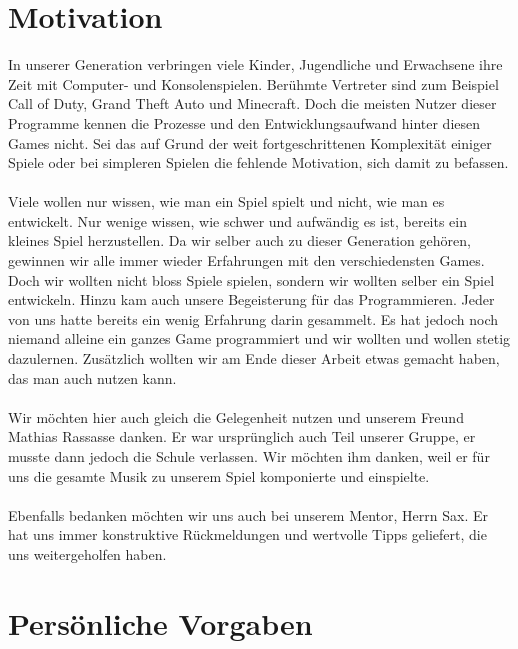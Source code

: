 \documentclass[11pt,a4paper]{scrbook}
\begin{document}
\section{Motivation}
In unserer Generation verbringen viele Kinder, Jugendliche und Erwachsene ihre Zeit mit Computer- und Konsolenspielen.
Berühmte Vertreter sind zum Beispiel Call of Duty, Grand Theft Auto und Minecraft.
Doch die meisten Nutzer dieser Programme kennen die Prozesse und den Entwicklungsaufwand hinter diesen Games nicht.
Sei das auf Grund der weit fortgeschrittenen Komplexität einiger Spiele
oder bei simpleren Spielen die fehlende Motivation, sich damit zu befassen.\\
\\
Viele wollen nur wissen, wie man ein Spiel spielt und nicht, wie man es entwickelt. Nur wenige wissen, wie schwer und aufwändig es ist, bereits ein kleines Spiel herzustellen.
Da wir selber auch zu dieser Generation gehören,
gewinnen wir alle immer wieder Erfahrungen mit den verschiedensten Games.
Doch wir wollten nicht bloss Spiele spielen,
sondern wir wollten selber ein Spiel entwickeln.
Hinzu kam auch unsere Begeisterung für das Programmieren.
Jeder von uns hatte bereits ein wenig Erfahrung darin gesammelt.
Es hat jedoch noch niemand alleine
ein ganzes Game programmiert und
wir wollten und wollen stetig dazulernen.
Zusätzlich wollten wir am Ende dieser Arbeit etwas gemacht haben, das man auch nutzen kann.\\
\\
Wir möchten hier auch gleich die Gelegenheit nutzen und unserem Freund Mathias Rassasse danken. Er war ursprünglich auch Teil unserer Gruppe, er musste dann jedoch die Schule verlassen. Wir möchten ihm danken, weil er für uns die gesamte Musik zu unserem Spiel komponierte und einspielte.\\
\\
Ebenfalls bedanken möchten wir uns auch bei unserem Mentor, Herrn Sax. Er hat uns immer konstruktive Rückmeldungen und wertvolle Tipps geliefert, die uns weitergeholfen haben.


\section{Persönliche Vorgaben}
\end{document}
